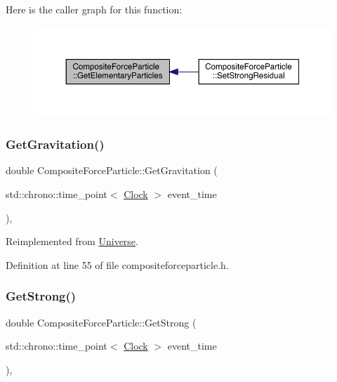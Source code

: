 Here is the caller graph for this function\+:\nopagebreak
\begin{figure}[H]
\begin{center}
\leavevmode
\includegraphics[width=350pt]{class_composite_force_particle_ab953693d61515b96fe78b0cf1da058c6_icgraph}
\end{center}
\end{figure}
\mbox{\label{class_composite_force_particle_a06483dc73c156679f34acf85aa5f924e}} 
\subsubsection{\texorpdfstring{Get\+Gravitation()}{GetGravitation()}}
{\footnotesize\ttfamily double Composite\+Force\+Particle\+::\+Get\+Gravitation (\begin{DoxyParamCaption}\item[{std\+::chrono\+::time\+\_\+point$<$ \hyperlink{universe_8h_a0ef8d951d1ca5ab3cfaf7ab4c7a6fd80}{Clock} $>$}]{event\+\_\+time }\end{DoxyParamCaption})\hspace{0.3cm}{\ttfamily [inline]}, {\ttfamily [virtual]}}



Reimplemented from \hyperlink{class_universe_ab0404e774ee0ed66b597ff5b8e989446}{Universe}.



Definition at line 55 of file compositeforceparticle.\+h.

\mbox{\label{class_composite_force_particle_a9818d469c9841eaf77fbe329b0953354}} 
\subsubsection{\texorpdfstring{Get\+Strong()}{GetStrong()}}
{\footnotesize\ttfamily double Composite\+Force\+Particle\+::\+Get\+Strong (\begin{DoxyParamCaption}\item[{std\+::chrono\+::time\+\_\+point$<$ \hyperlink{universe_8h_a0ef8d951d1ca5ab3cfaf7ab4c7a6fd80}{Clock} $>$}]{event\+\_\+time }\end{DoxyParamCaption})\hspace{0.3cm}{\ttfamily [inline]}, {\ttfamily [virtual]}}



